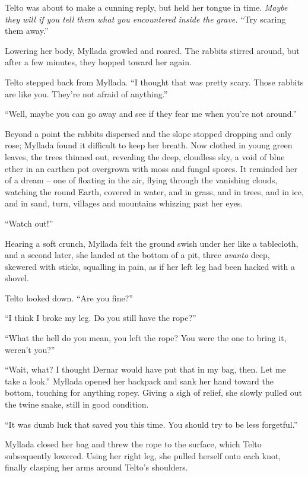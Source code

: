 Telto was about to make a cunning reply, but held her tongue in time. \emph{Maybe they will if you tell them what you encountered inside the grave.} ``Try scaring them away.''

Lowering her body, Myllada growled and roared. The rabbits stirred around, but after a few minutes, they hopped toward her again.

Telto stepped back from Myllada. ``I thought that was pretty scary. Those rabbits are like you. They're not afraid of anything.''

``Well, maybe you can go away and see if they fear me when you're not around.''

\centeredstars

Beyond a point the rabbits dispersed and the slope stopped dropping and only rose; Myllada found it difficult to keep her breath. Now clothed in young green leaves, the trees thinned out, revealing the deep, cloudless sky, a void of blue ether in an earthen pot overgrown with moss and fungal spores. It reminded her of a dream -- one of floating in the air, flying through the vanishing clouds, watching the round Earth, covered in water, and in grass, and in trees, and in ice, and in sand, turn, villages and mountains whizzing past her eyes.

``Watch out!''

Hearing a soft crunch, Myllada felt the ground swish under her like a tablecloth, and a second later, she landed at the bottom of a pit, three \emph{avanto} deep, skewered with sticks, squalling in pain, as if her left leg had been hacked with a shovel.

Telto looked down. ``Are you fine?''

``I think I broke my leg. Do you still have the rope?''

``What the hell do you mean, you left the rope? You were the one to bring it, weren't you?''

``Wait, what? I thought Dernar would have put that in my bag, then. Let me take a look.'' Myllada opened her backpack and sank her hand toward the bottom, touching for anything ropey. Giving a sigh of relief, she slowly pulled out the twine snake, still in good condition.

``It was dumb luck that saved you this time. You should try to be less forgetful.''

Myllada closed her bag and threw the rope to the surface, which Telto subsequently lowered. Using her right leg, she pulled herself onto each knot, finally clasping her arms around Telto's shoulders.

